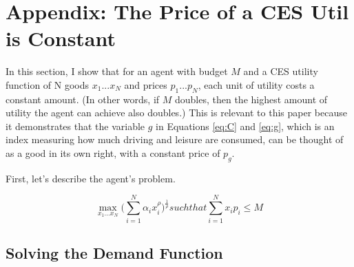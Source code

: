 \documentclass[letter, 12pt, epsf,leqno]{article}
\begin{document}
\section{Appendix: The Price of a CES Util is Constant} \label{sec:ces_calculation}

In this section, I show that for an agent with budget $M$ and a CES utility function of N goods $x_1...x_N$ and prices $p_1...p_N$, each unit of utility costs a constant amount.  (In other words, if $M$ doubles, then the highest amount of utility the agent can achieve also doubles.)  This is relevant to this paper because it demonstrates that the variable $g$ in Equations \ref{eq:C} and \ref{eq:g}, which is an index measuring how much driving and leisure are consumed, can be thought of as a good in its own right, with a constant price of $p_g$.

First, let's describe the agent's problem.

\begin{equation}\max_{x_1...x_N}   \Bigg(\sum_{i=1}^N \alpha_i x_i^\rho\Bigg)^\frac{1}{\rho} such that  \sum_{i=1}^N x_i p_i \le M\end{equation}


\subsection{Solving the Demand Function}
\end{document}
